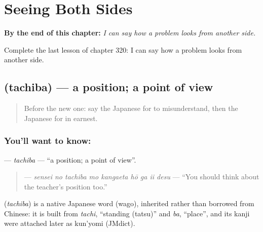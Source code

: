 
\chapter{Seeing Both Sides}
\label{ch:ja-seeing-both-sides}

\begin{chapteropening}
\textbf{By the end of this chapter:} \emph{I can say how a problem looks from another side.}

Complete the last lesson of chapter 320: I can say how a problem looks from another side.
\end{chapteropening}

\section[\texorpdfstring{\ja{たちば} (tachiba)}{たちば (tachiba)}]{ (tachiba) — a position; a point of view}

\label{lesson:JA-C320-tachiba}



\begin{quote}
Before the new one: say the Japanese for to misunderstand, then the Japanese for in earnest.
\end{quote}

\subsection*{You'll want to know: }
\textbf{} — \emph{tachiba} — \textquotedblleft{}a position; a point of view\textquotedblright{}.

\begin{quote}
\textbf{    } — \emph{sensei no tachiba mo kangaeta hō ga ii desu} — \textquotedblleft{}You should think about the teacher's position too.\textquotedblright{}
\end{quote}

\begin{cousinweb}
\textbf{} (\emph{tachiba}) is a native Japanese word (wago), inherited rather than borrowed from Chinese: it is built from \emph{tachi}, \textquotedblleft{}standing (tatsu)\textquotedblright{} and \emph{ba}, \textquotedblleft{}place\textquotedblright{}, and its kanji were attached later as kun'yomi (JMdict).
\end{cousinweb}

